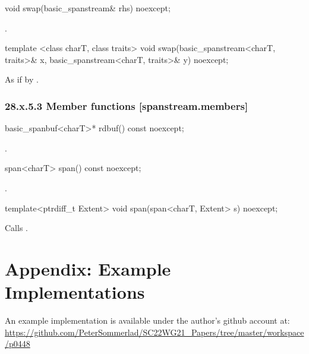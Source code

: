 \documentclass[ebook,11pt,article]{memoir}
\begin{document}
\begin{itemdecl}
void swap(basic_spanstream& rhs) noexcept;
\end{itemdecl}

\begin{itemdescr}
\pnum
\effects 
{}.
\end{itemdescr}


\begin{itemdecl}
template <class charT, class traits>
  void swap(basic_spanstream<charT, traits>& x,
            basic_spanstream<charT, traits>& y) noexcept;
\end{itemdecl}

\begin{itemdescr}
\pnum
\effects As if by .
\end{itemdescr}

\subsection{28.x.5.3 Member functions [spanstream.members]}
\label{spanstream.members}

\begin{itemdecl}
basic_spanbuf<charT>* rdbuf() const noexcept;
\end{itemdecl}

\begin{itemdescr}
\pnum
\returns
{}.
\end{itemdescr}

\begin{itemdecl}
span<charT> span() const noexcept;
\end{itemdecl}

\begin{itemdescr}
\pnum
\returns
{}.
\end{itemdescr}

\begin{itemdecl}
template<ptrdiff_t Extent>
void span(span<charT, Extent> s) noexcept;
\end{itemdecl}

\begin{itemdescr}
\pnum
\effects
Calls
.
\end{itemdescr}



\chapter{Appendix: Example Implementations}
An example implementation is available under the author's github account at:
\url{https://github.com/PeterSommerlad/SC22WG21_Papers/tree/master/workspace/p0448}
\end{document}

